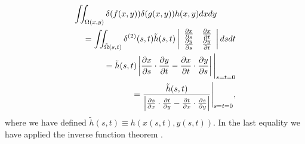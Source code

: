 \documentclass[a4paper,12pt]{report}
\begin{document}
\begin{eqnarray}
  \lefteqn{ \iint_{\Omega(x,y)} \delta(f(x,y))
    \delta(g(x,y))h(x,y) dx dy } \nonumber \\
  & & {} =\iint_{\tilde{\Omega }(s,t)} \delta^{(2)}(s,t)
  \tilde{h}(s,t)
  \left\vert \begin{array}{cc}
    \frac{\partial x}{\partial s} & 
    \frac{\partial x}{\partial t} \\
    \frac{\partial y}{\partial s} & 
    \frac{\partial y}{\partial t} \\
  \end{array} \right\vert ds dt \nonumber \\
  & & {} =\tilde{h}(s,t)\left \vert 
  \frac{\partial x}{\partial s}\cdot \frac{\partial y}{\partial t}
  -\frac{\partial x}{\partial t}\cdot \frac{\partial y}{\partial s}
  \right \vert \Bigg\vert_{s=t=0}\nonumber \\
  & & {} =\frac{\tilde{h}(s,t)}{\left \vert 
    \frac{\partial s}{\partial x}\cdot \frac{\partial t}{\partial y}
    -\frac{\partial t}{\partial x}\cdot \frac{\partial s}{\partial y}
    \right \vert}\Bigg\vert_{s=t=0},
\end{eqnarray}
where we have defined $\tilde{h}(s,t)\equiv h(x(s,t),y(s,t))$. 
In the last equality we have applied the inverse function 
theorem \cite{callahan2010}. 
  
\end{document}
